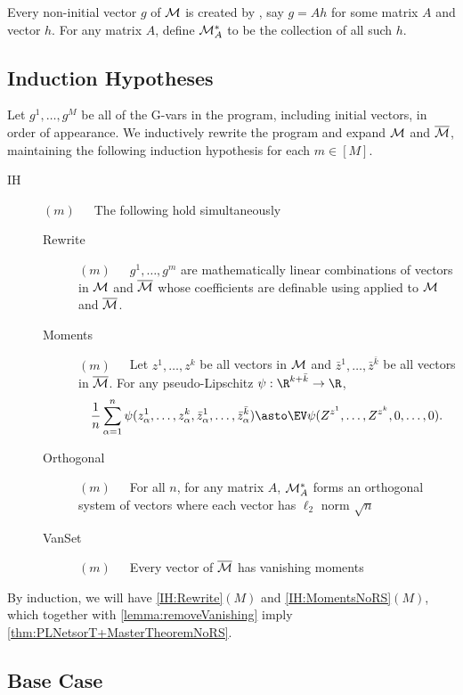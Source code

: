 \documentclass[main.tex]{subfiles}
\begin{document}
Every non-initial vector $g$ of $\mathcal{M}$ is created by , say $g=Ah$ for some matrix $A$ and vector $h$. For any matrix $A$, define $\mathcal{M}_{A}^{*}$ to be the collection of all such $h$.

\subsection{Induction Hypotheses}

Let $g^{1},\ldots,g^{M}$ be all of the G-vars in the program, including initial vectors, in order of appearance. We inductively rewrite the program and expand $\mathcal{M}$ and $\overline{\mathcal{M}}$, maintaining the following induction hypothesis for each $m\in[M]$.
\begin{description}
\item [IH\label{IH:NoRS}]\!\!\!$(m)$\ \ \ 
  The following hold simultaneously
  \begin{description}
  \item [Rewrite\label{IH:Rewrite}]\!\!\!$(m)$\ \ \ 
    $g^{1},\ldots,g^{m}$ are mathematically linear combinations of vectors in $\mathcal{M}$ and $\overline{\mathcal{M}}$ whose coefficients are definable using  applied to $\mathcal{M}$ and $\overline{\mathcal{M}}$.
  \item [Moments\label{IH:MomentsNoRS}]\!\!\!$(m)$\ \ \ 
    Let $z^{1},\ldots,z^{k}$ be all vectors in $\mathcal{M}$ and $\bar{z}^{1},\ldots,\bar{z}^{\bar{k}}$ be all vectors in $\overline{\mathcal{M}}$. For any pseudo-Lipschitz $\psi:\R^{k+\bar{k}}\to\R$,
  \[
  \frac{1}{n}\sum_{\alpha=1}^{n}\psi(z_{\alpha}^{1},\ldots,z_{\alpha}^{k},\bar{z}_{\alpha}^{1},\ldots,\bar{z}_{\alpha}^{\bar{k}})\asto\EV\psi(Z^{z^{1}},\ldots,Z^{z^{k}},0,\ldots,0).
  \]
  \item [Orthogonal\label{IH:Orthogonal}]\!\!\!$(m)$\ \ \ 
    For all $n$, for any matrix $A$, $\mathcal{M}_{A}^{*}$ forms an orthogonal system of vectors where each vector has $\ell_{2}$ norm $\sqrt{n}$
  \item [VanSet\label{IH:Vanset}]\!\!\!$(m)$\ \ \ 
    Every vector of $\overline{\mathcal{M}}$ has vanishing moments
  \end{description}
\end{description}
By induction, we will have \ref{IH:Rewrite}$(M)$ and \ref{IH:MomentsNoRS}$(M)$, which together with \cref{lemma:removeVanishing} imply \cref{thm:PLNetsorT+MasterTheoremNoRS}.

\subsection{Base Case}
\end{document}
